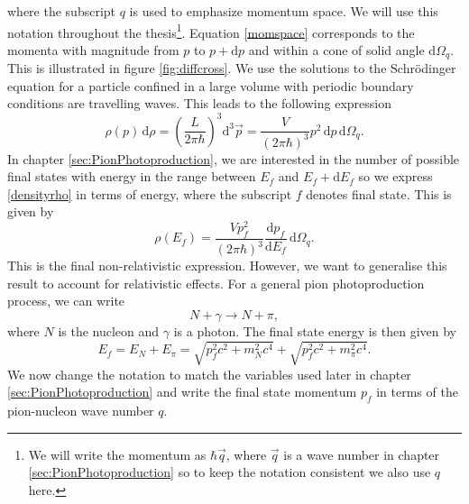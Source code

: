 where the subscript $q$ is used to emphasize momentum space. We will use this notation throughout the thesis\footnote{We will write the momentum as $\hbar \vec{q}$, where $\vec{q}$ is a wave number in chapter \ref{sec:PionPhotoproduction} so to keep the notation consistent we also use $q$ here. }. Equation \eqref{momspace} corresponds to the momenta with magnitude from $p$ to $p+\text{d}p$ and within a cone of solid angle $\text{d}\Omega_q$. This is illustrated in figure \ref{fig:diffcross}. We use the solutions to the Schrödinger equation for a particle confined in a large volume with periodic boundary conditions are travelling waves. This leads to the following expression
\begin{equation} \label{densityrho}
	\rho(p) \, \text{d}\rho = \left( \frac{L}{2\pi\hbar}\right)^3 \text{d}^3 \vec{p} = \frac{V}{(2\pi\hbar)^3} p^2 \, \text{d}p \, \text{d}\Omega_q.
\end{equation}
In chapter \ref{sec:PionPhotoproduction}, we are interested in the number of possible final states with energy in the range between $E_f$ and $E_f + \text{d}E_f$ so we express \eqref{densityrho} in terms of energy, where the subscript $f$ denotes final state. This is given by
\begin{equation} \label{densityenergy}
	\rho(E_f) = \frac{V p_f^2}{(2\pi \hbar)^3} \frac{\text{d}p_f}{\text{d}E_f} \, \text{d}\Omega_q.
\end{equation}
This is the final non-relativistic expression. However, we want to generalise this result to account for relativistic effects. For a general pion photoproduction process, we can write
\begin{equation} \label{twobody}
	N + \gamma \rightarrow N+\pi,
\end{equation}
where $N$ is the nucleon and $\gamma$ is a photon. The final state energy \cite{Kernebog} is then given by
\begin{equation} \label{Ef}
	E_f = E_N + E_\pi = \sqrt{p_f^2 c^2 +m_N^2c^4} + \sqrt{p_f^2c^2 + m^2_\pi c^4}.
\end{equation}
We now change the notation to match the variables used later in chapter \ref{sec:PionPhotoproduction} and write the final state momentum $p_f$ in terms of the pion-nucleon wave number $q$. 


